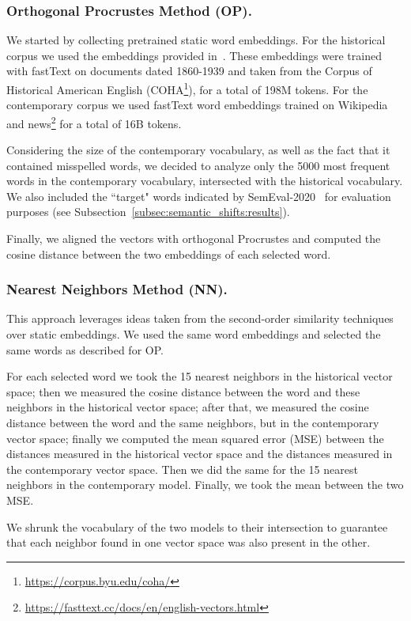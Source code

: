 \documentclass[runningheads]{llncs}
\begin{document}
\subsubsection{Orthogonal Procrustes Method (OP).} We started by collecting pretrained static word embeddings. For the historical corpus we used the embeddings provided in~\cite{sprugnoli-tonelli-2019-histo}. These embeddings were trained with fastText on documents dated 1860-1939 and taken from the Corpus of Historical American English (COHA\footnote{\url{https://corpus.byu.edu/coha/}}), for a total of 198M tokens. For the contemporary corpus we used fastText word embeddings trained on Wikipedia and news\footnote{\url{https://fasttext.cc/docs/en/english-vectors.html}} for a total of 16B tokens.

Considering the size of the contemporary vocabulary, as well as the fact that it contained misspelled words, we decided to analyze only the 5000 most frequent words in the contemporary vocabulary, intersected with the historical vocabulary. We also included the “target" words indicated by SemEval-2020~\cite{schlechtweg-etal-2020-semeval} for evaluation purposes (see Subsection~\ref{subsec:semantic_shifts:results}).

Finally, we aligned the vectors with orthogonal Procrustes and computed the cosine distance between the two embeddings of each selected word.

\subsubsection{Nearest Neighbors Method (NN).} This approach leverages ideas taken from the second-order similarity techniques over static embeddings. We used the same word embeddings and selected the same words as described for OP.

For each selected word we took the 15 nearest neighbors in the historical vector space; then we measured the cosine distance between the word and these neighbors in the historical vector space; after that, we measured the cosine distance between the word and the same neighbors, but in the contemporary vector space; finally we computed the mean squared error (MSE) between the distances measured in the historical vector space and the distances measured in the contemporary vector space. Then we did the same for the 15 nearest neighbors in the contemporary model. Finally, we took the mean between the two MSE. 

We shrunk the vocabulary of the two models to their intersection to guarantee that each neighbor found in one vector space was also present in the other. 
\end{document}
